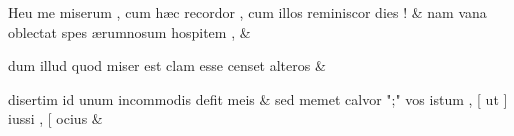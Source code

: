 \documentclass[12pt,onecolumn,twoside,a4paper]{memoir}
\begin{document}
\begin{pairs}
\begin{Leftside}
                              Heu
                              me
                              miserum
                              ,
                              cum
                              hæc
                              recordor
                              ,
                              cum
                              illos
                              reminiscor
                              dies
                              ! \&
                         \stanza {}nam
                              vana
                              oblectat
                              spes
                              ærumnosum
                              hospitem
                              , & 
                     
                              dum
                              illud
                              quod
                              miser
                              est
                              clam
                              esse
                              censet
                              alteros \&
                         \stanza {}
                     
                              disertim
                              id
                              unum
                              incommodis
                              defit
                              meis \&
                         \stanza {}sed
                              memet
                              calvor
                              ";"
                              vos
                              istum
                              ,
                              [
                              ut
                              ]
                              iussi
                              ,
                              [
                              ocius & 
                     

\end{Leftside}
\end{pairs}
\end{document}
